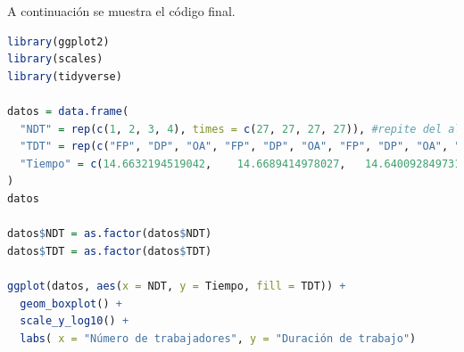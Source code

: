 \documentclass{article}
\begin{document}
A continuaci\'on se muestra el c\'odigo final.

\begin{lstlisting}[language=R, caption= C\'odigo utilizado para generar Boxplot.]
library(ggplot2)
library(scales)
library(tidyverse)

datos = data.frame(
  "NDT" = rep(c(1, 2, 3, 4), times = c(27, 27, 27, 27)), #repite del al 4 27 veces cada uno
  "TDT" = rep(c("FP", "DP", "OA", "FP", "DP", "OA", "FP", "DP", "OA", "FP", "DP", "OA"), times = c(9, 9, 9, 9, 9, 9, 9, 9, 9, 9, 9, 9)), 
  "Tiempo" = c(14.6632194519042,	14.6689414978027,	14.6400928497314,	14.7817134857177,	10.1368427276611,	16.0033702850341,	15.1014328002929,	14.5940780639648,	19.763708114624,	15.0637626647949,	8.00037384033203,	20.5345153808593,	14.9371623992919,	15.2616500854492,	15.5577659606933,	13.9107704162597,	19.8197364807128,	19.3409919738769,	20.5903053283691,	17.2526836395263,	9.84764099121093,	15.1457786560058,	15.122652053833,	15.3250694274902,	19.301414489746,	22.6647853851318,	13.5760307312011,	9.5534324645996,	10.1165771484375,	10.5707645416259,	10.1063251495361,	10.0808143615722,	9.58919525146484,	9.85145568847656,	11.9268894195556,	9.95707511901855,	9.93013381958007,	3.55696678161621,	9.91225242614746,	10.1029872894287,	9.59086418151855,	10.1222991943359,	14.8596763610839,	15.1095390319824,	5.00893592834472,	9.58704948425292,	10.1697444915771,	10.23530960083,	9.61017608642578,	9.20867919921875,	9.60993766784667,	9.87768173217773,	9.60707664489746,	9.50002670288085,	10.0886821746826,	10.1439952850341,	10.5109214782714,	4.04214859008789,	10.0753307342529,	9.83428955078125,	9.97304916381835,	10.3750228881835,	9.69386100769042,	0,	9.85026359558105,	10.1709365844726,	9.75704193115234,	9.92989540100097,	10.394811630249,	10.3027820587158,	8.60190391540527,	5.08999824523925,	7.99918174743652,	9.51886177062988,	0,	10.2787017822265,	10.3039741516113,	8.00061225891113,	14.5168304443359,	9.90939140319824,	0,	9.6750259399414,	10.0939273834228,	5.09929656982421,	9.71102714538574,	9.9799633026123,	10.0970268249511,	0,	8.00085067749023,	9.92918014526367,	9.59515571594238,	5.56445121765136,	5.07974624633789,	10.1842880249023,	9.59181785583496,	0,	5.00750541687011,	10.0986957550048,	10.1239681243896,	5.04970550537109,	10.1282596588134,	5.0969123840332,	5.04279136657714,	10.2267265319824,	5.08332252502441,	5.0661563873291,	9.28521156311035,	0)
)
datos 

datos$NDT = as.factor(datos$NDT)
datos$TDT = as.factor(datos$TDT)

ggplot(datos, aes(x = NDT, y = Tiempo, fill = TDT)) +
  geom_boxplot() +
  scale_y_log10() +
  labs( x = "Número de trabajadores", y = "Duración de trabajo")
\end{lstlisting}
\end{document}
